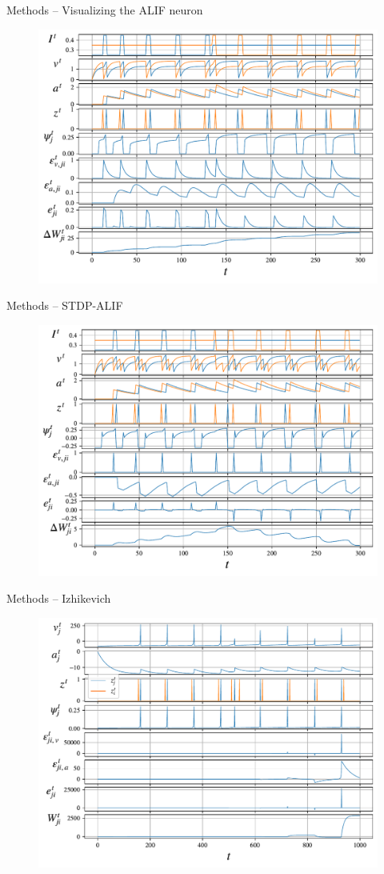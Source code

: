 \documentclass[t]{beamer}
\begin{document}
\begin{frame}{Methods -- Visualizing the ALIF neuron}
  \begin{figure}[!ht]
    \centering
    \includegraphics[width=0.8\linewidth]{alif}
  \end{figure}
\end{frame}

\begin{frame}{Methods -- STDP-ALIF}
  \begin{figure}[!ht]
    \centering
    \includegraphics[width=.8\linewidth]{stdpalif}
  \end{figure}
\end{frame}
\begin{frame}{Methods -- Izhikevich}
  \begin{figure}[!ht]
    \centering
    \includegraphics[width=0.8\linewidth]{demo_izh}
  \end{figure}
\end{frame}
\end{document}
